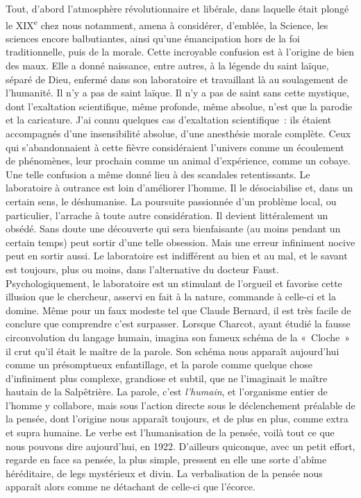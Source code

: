 \documentclass[french,twoside]{book} %
\begin{document}
Tout, d’abord l’atmosphère révolutionnaire et libérale, dans laquelle était plongé le XIX\textsuperscript{e} chez nous notamment, amena à considérer, d’emblée, la Science, les sciences encore balbutiantes, ainsi qu’une émancipation hors de la foi traditionnelle, puis de la morale. Cette incroyable confusion est à l’origine de bien des maux. Elle a donné naissance, entre autres, à la légende du saint laïque, séparé de Dieu, enfermé dans son laboratoire et travaillant là au soulagement de l’humanité. Il n’y a pas de saint laïque. Il n’y a pas de saint sans cette mystique, dont l’exaltation scientifique, même profonde, même absolue, n’est que la parodie et la caricature. J’ai connu quelques cas d’exaltation scientifique : ils étaient accompagnés d’une insensibilité absolue, d’une anesthésie morale complète. Ceux qui s’abandonnaient à cette fièvre considéraient l’univers comme un écoulement de phénomènes, leur prochain comme un animal d’expérience, comme un cobaye. Une telle confusion a même donné lieu à des scandales retentissants. Le laboratoire à outrance est loin d’améliorer l’homme. Il le désociabilise et, dans un certain sens, le déshumanise. La poursuite passionnée d’un problème local, ou particulier, l’arrache à toute autre considération. Il devient littéralement un obsédé. Sans doute une découverte qui sera bienfaisante (au moins pendant un certain temps) peut sortir d’une telle obsession. Mais une erreur infiniment nocive peut en sortir aussi. Le laboratoire est indifférent au bien et au mal, et le savant est toujours, plus ou moins, dans l’alternative du docteur Faust. Psychologiquement, le laboratoire est un stimulant de l’orgueil et favorise cette illusion que le chercheur, asservi en fait à la nature, commande à celle-ci et la domine. Même pour un faux modeste tel que Claude Bernard, il est très facile de conclure que comprendre c’est surpasser. Lorsque Charcot, ayant étudié la fausse circonvolution du langage humain, imagina son fameux schéma de la « Cloche » il crut qu’il était le maître de la parole. Son schéma nous apparaît aujourd’hui comme un présomptueux enfantillage, et la parole comme quelque chose d’infiniment plus complexe, grandiose et subtil, que ne l’imaginait le maître hautain de la Salpêtrière. La parole, c’est {\itshape l’humain}, et l’organisme entier de l’homme y collabore, mais sous l’action directe sous le déclenchement préalable de la pensée, dont l’origine nous apparaît toujours, et de plus en plus, comme extra et supra humaine. Le verbe est l’humanisation de la pensée, voilà tout ce que nous pouvons dire aujourd’hui, en 1922. D’ailleurs quiconque, avec un petit effort, regarde en face sa pensée, la plus simple, pressent en elle une sorte d’abîme héréditaire, de legs mystérieux et divin. La verbalisation de la pensée nous apparaît alors comme ne détachant de celle-ci que l’écorce.\par
\end{document}
